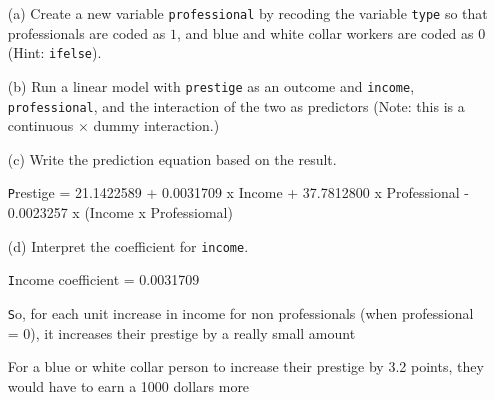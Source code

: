 \documentclass[12pt,letterpaper]{article}
\begin{document}
\newpage
\begin{enumerate}
	
	\item [(a)]
	Create a new variable \texttt{professional} by recoding the variable \texttt{type} so that professionals are coded as $1$, and blue and white collar workers are coded as $0$ (Hint: \texttt{ifelse}).
	
	\vspace{0.5cm}
	  
	\vspace{0.5cm}
	
	
	\item [(b)]
	Run a linear model with \texttt{prestige} as an outcome and \texttt{income}, \texttt{professional}, and the interaction of the two as predictors (Note: this is a continuous $\times$ dummy interaction.)
	
	\vspace{0.5cm}
	  
	\vspace{0.5cm}
	
	\item [(c)]
	Write the prediction equation based on the result.
	
	\vspace{0.5cm}
	
    \texttt  Prestige = 21.1422589 + 0.0031709 x Income + 37.7812800 x Professional - 0.0023257 x (Income x Professiomal)
   
	\vspace{0.5cm}
	
\newpage
	\item [(d)]
	Interpret the coefficient for \texttt{income}.
	
	\vspace{0.5cm}
	
	\texttt  Income coefficient = 0.0031709
	
	\vspace{0.5cm}
	
	\texttt  So, for each unit increase in income for non professionals (when professional = 0), it increases their prestige by a really small amount
	
	For a blue or white collar person to increase their prestige by 3.2 points, they would have to earn a 1000 dollars more
	
	\vspace{0.5cm}
	

\end{enumerate}
\end{document}
